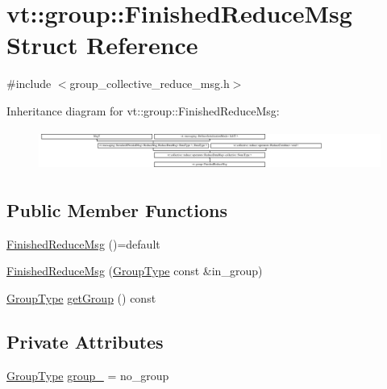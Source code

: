 \hypertarget{structvt_1_1group_1_1_finished_reduce_msg}{}\section{vt\+:\+:group\+:\+:Finished\+Reduce\+Msg Struct Reference}
\label{structvt_1_1group_1_1_finished_reduce_msg}


{\ttfamily \#include $<$group\+\_\+collective\+\_\+reduce\+\_\+msg.\+h$>$}

Inheritance diagram for vt\+:\+:group\+:\+:Finished\+Reduce\+Msg\+:\begin{figure}[H]
\begin{center}
\leavevmode
\includegraphics[height=1.335719cm]{structvt_1_1group_1_1_finished_reduce_msg}
\end{center}
\end{figure}
\subsection*{Public Member Functions}
\begin{DoxyCompactItemize}
\item 
\hyperlink{structvt_1_1group_1_1_finished_reduce_msg_a3916286ab9b8d8b3e9534126abe02edd}{Finished\+Reduce\+Msg} ()=default
\item 
\hyperlink{structvt_1_1group_1_1_finished_reduce_msg_a5be4d7bc5a37d820ba93c02fcf1c4055}{Finished\+Reduce\+Msg} (\hyperlink{namespacevt_a27b5e4411c9b6140c49100e050e2f743}{Group\+Type} const \&in\+\_\+group)
\item 
\hyperlink{namespacevt_a27b5e4411c9b6140c49100e050e2f743}{Group\+Type} \hyperlink{structvt_1_1group_1_1_finished_reduce_msg_af8357b5d9faa6df84ba31746f66ac979}{get\+Group} () const
\end{DoxyCompactItemize}
\subsection*{Private Attributes}
\begin{DoxyCompactItemize}
\item 
\hyperlink{namespacevt_a27b5e4411c9b6140c49100e050e2f743}{Group\+Type} \hyperlink{structvt_1_1group_1_1_finished_reduce_msg_abb883384574d4ace6af3eecd90587c8c}{group\+\_\+} = no\+\_\+group
\end{DoxyCompactItemize}

